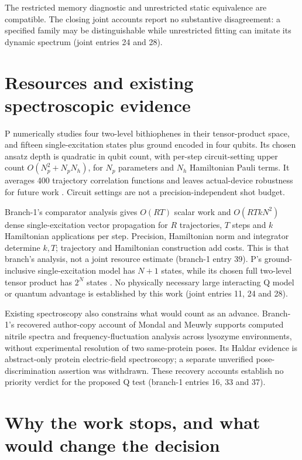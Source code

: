 \documentclass{article}
\begin{document}
The restricted memory diagnostic and unrestricted static equivalence are compatible. The closing joint accounts report no substantive disagreement: a specified family may be distinguishable while unrestricted fitting can imitate its dynamic spectrum (joint entries 24 and 28).

\section{Resources and existing spectroscopic evidence}

P numerically studies four two-level bithiophenes in their tensor-product space, and fifteen single-excitation states plus ground encoded in four qubits. Its chosen ansatz depth is quadratic in qubit count, with per-step circuit-setting upper count \(O(N_p^2+N_pN_h)\), for \(N_p\) parameters and \(N_h\) Hamiltonian Pauli terms. It averages 400 trajectory correlation functions and leaves actual-device robustness for future work \cite{P}. Circuit settings are not a precision-independent shot budget.

Branch-1's comparator analysis gives \(O(RT)\) scalar work and \(O(RTkN^2)\) dense single-excitation vector propagation for \(R\) trajectories, \(T\) steps and \(k\) Hamiltonian applications per step. Precision, Hamiltonian norm and integrator determine \(k,T\); trajectory and Hamiltonian construction add costs. This is that branch's analysis, not a joint resource estimate (branch-1 entry 39). P's ground-inclusive single-excitation model has \(N+1\) states, while its chosen full two-level tensor product has \(2^N\) states \cite{P}. No physically necessary large interacting Q model or quantum advantage is established by this work (joint entries 11, 24 and 28).

Existing spectroscopy also constrains what would count as an advance. Branch-1's recovered author-copy account of Mondal and Meuwly supports computed nitrile spectra and frequency-fluctuation analysis across lysozyme environments, without experimental resolution of two same-protein poses. Its Haldar evidence is abstract-only protein electric-field spectroscopy; a separate unverified pose-discrimination assertion was withdrawn. These recovery accounts establish no priority verdict for the proposed Q test (branch-1 entries 16, 33 and 37).

\section{Why the work stops, and what would change the decision}
\end{document}
